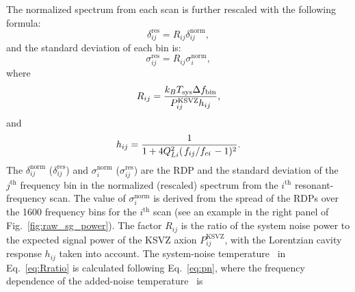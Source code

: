 %
%
The normalized spectrum from each scan is further rescaled 
 with the following formula:
\begin{equation}
  \label{eq:respower_eqn}
  \delta_{ij}^\text{res} = R_{ij}\delta_{ij}^\text{norm},
\end{equation}
and the standard deviation of each bin is:
\begin{equation}
  \label{eq:ressigma_eqn}
  \sigma_{ij}^\text{res} = R_{ij}\sigma_{i}^\text{norm},
\end{equation}
where 
 \begin{equation}
 R_{ij} = \frac{k_{B}T_\text{sys} \Delta f_\text{bin} }{P_{ij}^\text{KSVZ} h_{ij}}, 
 \label{eq:Rratio}
 \end{equation}
and 
 \begin{equation}
 h_{ij} = \frac{1}{1 + 4Q_{Li}^{2}(\left.f_{ij}\middle/f_{ci}\right.-1)^2}. 
 \label{eq:Lorentz}
 \end{equation}
The $\delta_{ij}^\text{norm}$ ($\delta_{ij}^\text{res}$) and 
$\sigma_{i}^\text{norm}$ ($\sigma_{ij}^\text{res}$) are the 
RDP and the standard deviation of the $j^\text{th}$ frequency bin in 
the normalized (rescaled) spectrum from the 
$i^\text{th}$ resonant-frequency scan. 
The value of $\sigma_{i}^\text{norm}$ is derived from the spread of the 
RDPs over the 1600 frequency bins for the $i^\text{th}$ scan 
(see an example in the right panel of Fig.~\ref{fig:raw_sg_power}). 
The factor $R_{ij}$ is the ratio of 
the system noise power to the expected signal power of the KSVZ axion 
$P_{ij}^\text{KSVZ}$, with the Lorentzian cavity response $h_{ij}$ 
taken into account. 
The system-noise temperature \tsys\ in Eq.~\eqref{eq:Rratio} is calculated 
following Eq.~\eqref{eq:pn},
 where the frequency dependence of the added-noise temperature \ta\ is 
